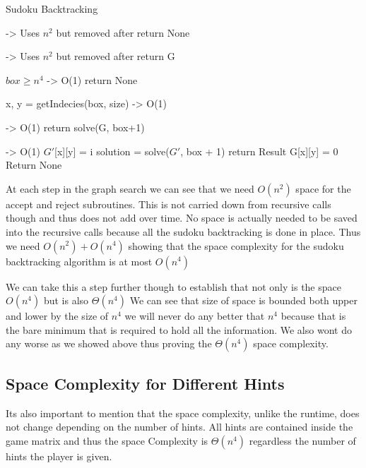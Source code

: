 \documentclass{sig-alternate}
\begin{document}
\begin{algorithm}
\caption{Sudoku Backtracking}\label{solve}
\begin{algorithmic}[1]

 -> Uses $n^2$ but removed after
\State return None
\EndIf

 -> Uses $n^2$ but removed after
\State return G
\EndIf

\If $box \ge n^4$  -> O(1)
\State return None
\EndIf

\State x, y = getIndecies(box, size) -> O(1)

  -> O(1)
\State return solve(G, box+1) 
\EndIf

 -> O(1)
\State $G'$[x][y] = i
\State solution = solve($G'$, box + 1)
\State return Result
\EndIf
\EndFor
\State G[x][y] = 0
\State Return None
\EndProcedure
\end{algorithmic}
\end{algorithm}

At each step in the graph search we can see that we need $O(n^2)$ space for the accept and reject subroutines. This is not carried down from recursive calls though and thus does not add over time. No space is actually needed to be saved into the recursive calls because all the sudoku backtracking is done in place. Thus we need $O(n^2) + O(n^4)$ showing that the space complexity for the sudoku backtracking algorithm is at most $O(n^4)$

We can take this a step further though to establish that not only is the space $O(n^4)$ but is also $\Theta(n^4)$ We can see that size of space is bounded both upper and lower by the size of $n^4$ we will never do any better that $n^4$ because that is the bare minimum that is required to hold all the information. We also wont do any worse as we showed above thus proving the $\Theta(n^4)$ space complexity. 

\subsection{Space Complexity for Different Hints}
Its also important to mention that the space complexity, unlike the runtime, does not change depending on the number of hints. All hints are contained inside the game matrix and thus the space Complexity is $\Theta(n^4)$ regardless the number of hints the player is given. 

\end{document}
